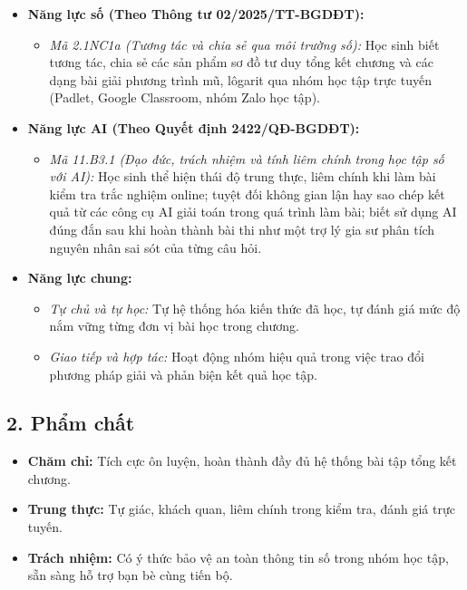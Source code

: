 \documentclass[12pt, a4paper]{article}
\begin{document}
\begin{itemize}[leftmargin=1.2cm]
    \item \textbf{Năng lực số (Theo Thông tư 02/2025/TT-BGDĐT):}
    \begin{itemize}[leftmargin=0.6cm]
        \item \textit{Mã 2.1NC1a (Tương tác và chia sẻ qua môi trường số):} Học sinh biết tương tác, chia sẻ các sản phẩm sơ đồ tư duy tổng kết chương và các dạng bài giải phương trình mũ, lôgarit qua nhóm học tập trực tuyến (Padlet, Google Classroom, nhóm Zalo học tập).
    \end{itemize}

    \item \textbf{Năng lực AI (Theo Quyết định 2422/QĐ-BGDĐT):}
    \begin{itemize}[leftmargin=0.6cm]
        \item \textit{Mã 11.B3.1 (Đạo đức, trách nhiệm và tính liêm chính trong học tập số với AI):} Học sinh thể hiện thái độ trung thực, liêm chính khi làm bài kiểm tra trắc nghiệm online; tuyệt đối không gian lận hay sao chép kết quả từ các công cụ AI giải toán trong quá trình làm bài; biết sử dụng AI đúng đắn sau khi hoàn thành bài thi như một trợ lý gia sư phân tích nguyên nhân sai sót của từng câu hỏi.
    \end{itemize}

    \item \textbf{Năng lực chung:}
    \begin{itemize}[leftmargin=0.6cm]
        \item \textit{Tự chủ và tự học:} Tự hệ thống hóa kiến thức đã học, tự đánh giá mức độ nắm vững từng đơn vị bài học trong chương.
        \item \textit{Giao tiếp và hợp tác:} Hoạt động nhóm hiệu quả trong việc trao đổi phương pháp giải và phản biện kết quả học tập.
    \end{itemize}
\end{itemize}

\subsection*{2. Phẩm chất}

\begin{itemize}[leftmargin=1.2cm]
    \item \textbf{Chăm chỉ:} Tích cực ôn luyện, hoàn thành đầy đủ hệ thống bài tập tổng kết chương.
    \item \textbf{Trung thực:} Tự giác, khách quan, liêm chính trong kiểm tra, đánh giá trực tuyến.
    \item \textbf{Trách nhiệm:} Có ý thức bảo vệ an toàn thông tin số trong nhóm học tập, sẵn sàng hỗ trợ bạn bè cùng tiến bộ.
\end{itemize}
\end{document}
